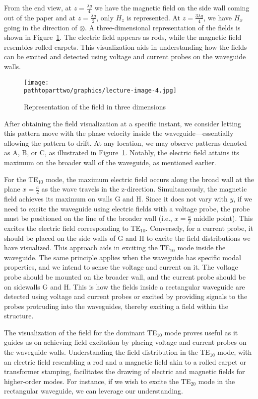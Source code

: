 From the end view, at $z=\frac{\lambda g}{4}$ we have the magnetic field on the side wall coming out of the paper and at $z=\frac{\lambda g}{2}$, only $H_{z}$ is represented. At $z=\frac{3\lambda g}{4}$, we have $H_{x}$ going in the direction of $\otimes$. A three-dimensional representation of the fields is shown in Figure~\ref{fig:lectureimage4}. The electric field appears as rods, while the magnetic field resembles rolled carpets. This visualization aids in understanding how the fields can be excited and detected using voltage and current probes on the waveguide walls.
\begin{figure}[h]
\centering
\texttt{[image: \\pathtoparttwo/graphics/lecture-image-4.jpg]}
\caption{Representation of the field in three dimensions}
\label{fig:lectureimage4}
\end{figure}

After obtaining the field visualization at a specific instant, we consider letting this pattern move with the phase velocity inside the waveguide—essentially allowing the pattern to drift. At any location, we may observe patterns denoted as A, B, or C, as illustrated in Figure~\ref{fig:lectureimage4}. Notably, the electric field attains its maximum on the broader wall of the waveguide, as mentioned earlier.

For the TE$_{10}$ mode, the maximum electric field occurs along the broad wall at the plane $x = \frac{a}{2}$ as the wave travels in the z-direction. Simultaneously, the magnetic field achieves its maximum on walls G and H. Since it does not vary with $y$, if we need to excite the waveguide using electric fields with a voltage probe, the probe must be positioned on the line of the broader wall (i.e., $x = \frac{a}{2}$ middle point). This excites the electric field corresponding to TE$_{10}$. Conversely, for a current probe, it should be placed on the side walls of G and H to excite the field distributions we have visualized. This approach aids in exciting the TE$_{10}$ mode inside the waveguide. The same principle applies when the waveguide has specific modal properties, and we intend to sense the voltage and current on it. The voltage probe should be mounted on the broader wall, and the current probe should be on sidewalls G and H. This is how the fields inside a rectangular waveguide are detected using voltage and current probes or excited by providing signals to the probes protruding into the waveguides, thereby exciting a field within the structure.

The visualization of the field for the dominant TE$_{10}$ mode proves useful as it guides us on achieving field excitation by placing voltage and current probes on the waveguide walls. Understanding the field distribution in the TE$_{10}$ mode, with an electric field resembling a rod and a magnetic field akin to a rolled carpet or transformer stamping, facilitates the drawing of electric and magnetic fields for higher-order modes. For instance, if we wish to excite the TE$_{20}$ mode in the rectangular waveguide, we can leverage our understanding.

